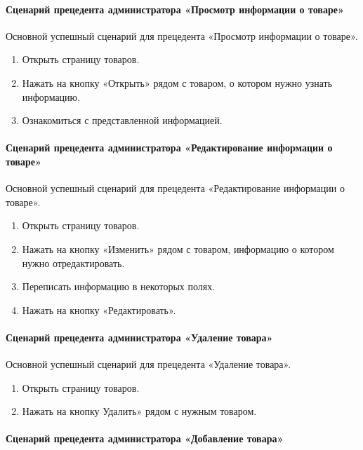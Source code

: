 \paragraph{Сценарий прецедента администратора «Просмотр информации о товаре»}

Основной успешный сценарий для прецедента «Просмотр информации о товаре».
\begin{enumerate}
	\item Открыть страницу товаров.
	\item Нажать на кнопку «Открыть» рядом с товаром, о котором нужно узнать информацию.
	\item Ознакомиться с представленной информацией.
\end{enumerate}

\paragraph{Сценарий прецедента администратора «Редактирование информации о товаре»}

Основной успешный сценарий для прецедента «Редактирование информации о товаре».
\begin{enumerate}
	\item Открыть страницу товаров.
	\item Нажать на кнопку «Изменить» рядом с товаром, информацию о котором нужно отредактировать.
	\item Переписать информацию в некоторых полях.
	\item Нажать на кнопку «Редактировать».
\end{enumerate}

\paragraph{Сценарий прецедента администратора «Удаление товара»}

Основной успешный сценарий для прецедента «Удаление товара».
\begin{enumerate}
	\item Открыть страницу товаров.
	\item Нажать на кнопку Удалить» рядом с нужным товаром.
\end{enumerate}

\paragraph{Сценарий прецедента администратора «Добавление товара»}

